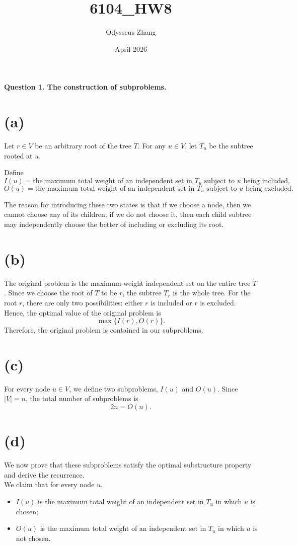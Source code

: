 \documentclass{article}
\title{6104_HW8}
\author{Odysseus Zhang}
\date{April 2026}
\begin{document}
\paragraph{Question 1. The construction of subproblems.} 
\section{(a)}
 Let \(r\in V\) be an arbitrary root of the tree \(T\). For any \(u\in V\), let \(T_u\) be the subtree rooted at \(u\).

Define
\[
I(u)=\text{the maximum total weight of an independent set in }T_u\text{ subject to }u\text{ being included,}
\]
\[
O(u)=\text{the maximum total weight of an independent set in }T_u\text{ subject to }u\text{ being excluded.}
\]

The reason for introducing these two states is that if we choose a node, then we cannot choose any of its children; if we do not choose it, then each child subtree may independently choose the better of including or excluding its root.

\medskip

\section*{(b)} The original problem is the maximum-weight independent set on the entire tree \(T\). Since we choose the root of \(T\) to be \(r\), the subtree \(T_r\) is the whole tree. For the root \(r\), there are only two possibilities: either \(r\) is included or \(r\) is excluded. Hence, the optimal value of the original problem is
\[
\max\{I(r),O(r)\}.
\]
Therefore, the original problem is contained in our subproblems.

\medskip

\section*{(c)} For every node \(u\in V\), we define two subproblems, \(I(u)\) and \(O(u)\). Since \(|V|=n\), the total number of subproblems is
\[
2n=O(n).
\]

\medskip

\section*{(d)}
We now prove that these subproblems satisfy the optimal substructure property and derive the recurrence.
\\
We claim that for every node \(u\),
\begin{itemize}
    \item \(I(u)\) is the maximum total weight of an independent set in \(T_u\) in which \(u\) is chosen;
    \item \(O(u)\) is the maximum total weight of an independent set in \(T_u\) in which \(u\) is not chosen.
\end{itemize}
\end{document}
